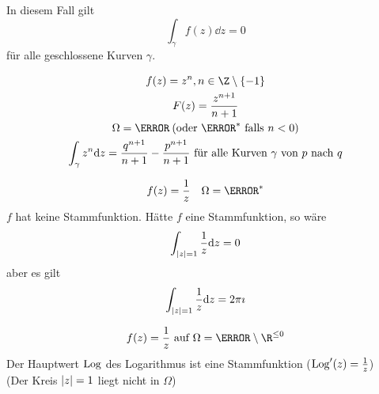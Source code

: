 \begin{korr*}
	In diesem Fall gilt
	\[ \int_\gamma f(z) \dd z = 0 \]
	für alle geschlossene Kurven $\gamma$.
\end{korr*}
\begin{bsp}
	\begin{gather*}
		f(z) = z^n , n \in \Z \setminus \{ -1 \} \\
		F(z) = \frac{z^{n+1}}{n+1} \\
		\Omega = \C \: (\text{oder $\C^*$ falls $n < 0$)} \\
		\int_\gamma z^n \dd z = \frac{q^{n+1}}{n+1} - \frac{p^{n+1}}{n+1} \text{ für alle Kurven $\gamma$ von $p$ nach $q$}
	\end{gather*}
\end{bsp}
\begin{bsp}
	\[ f(z) = \frac{1}{z} \quad \Omega = \C^* \]
	$f$ hat keine Stammfunktion. Hätte $f$ eine Stammfunktion, so wäre
	\[ \int_{\abs{z}=1} \frac{1}{z} \dd z = 0 \]
	aber es gilt
	\[ \int_{\abs{z}=1} \frac{1}{z} \dd z = 2\pi\imath \]
\end{bsp}
\begin{bsp}
	\[ f(z) = \frac{1}{z} \text{ auf } \Omega = \C \setminus \R^{\leq 0} \]
	Der Hauptwert $\operatorname{Log}$ des Logarithmus ist eine Stammfunktion ($\operatorname{Log}'(z) = \frac{1}{z}$) \\
	(Der Kreis $\abs{z}=1$ liegt nicht in $\Omega$)
\end{bsp}

